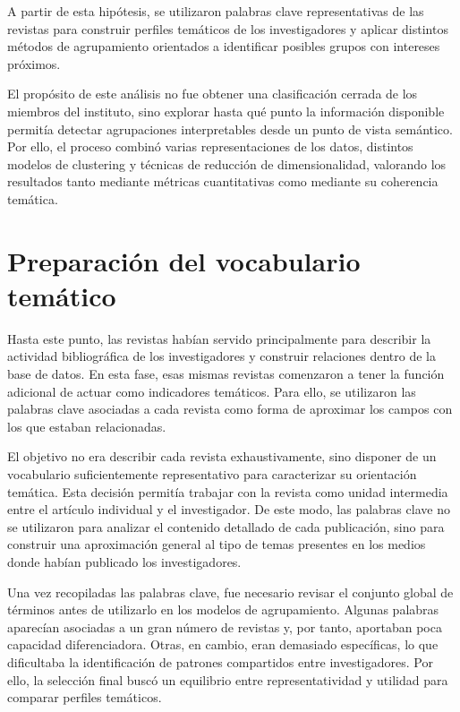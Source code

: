 \documentclass[11pt,spanish,listoffigures,listoftables]{tfgetsinf}
\begin{document}
A partir de esta hipótesis, se utilizaron palabras clave representativas de las revistas para construir perfiles temáticos de los investigadores y aplicar distintos métodos de agrupamiento orientados a identificar posibles grupos con intereses próximos.

El propósito de este análisis no fue obtener una clasificación cerrada de los miembros del instituto, sino explorar hasta qué punto la información disponible permitía detectar agrupaciones interpretables desde un punto de vista semántico. Por ello, el proceso combinó varias representaciones de los datos, distintos modelos de clustering y técnicas de reducción de dimensionalidad, valorando los resultados tanto mediante métricas cuantitativas como mediante su coherencia temática.

\section{Preparación del vocabulario temático}

Hasta este punto, las revistas habían servido principalmente para describir la actividad bibliográfica de los investigadores y construir relaciones dentro de la base de datos. En esta fase, esas mismas revistas comenzaron a tener la función adicional de actuar como indicadores temáticos. Para ello, se utilizaron las palabras clave asociadas a cada revista como forma de aproximar los campos con los que estaban relacionadas.

El objetivo no era describir cada revista exhaustivamente, sino disponer de un vocabulario suficientemente representativo para caracterizar su orientación temática. Esta decisión permitía trabajar con la revista como unidad intermedia entre el artículo individual y el investigador. De este modo, las palabras clave no se utilizaron para analizar el contenido detallado de cada publicación, sino para construir una aproximación general al tipo de temas presentes en los medios donde habían publicado los investigadores.

Una vez recopiladas las palabras clave, fue necesario revisar el conjunto global de términos antes de utilizarlo en los modelos de agrupamiento. Algunas palabras aparecían asociadas a un gran número de revistas y, por tanto, aportaban poca capacidad diferenciadora. Otras, en cambio, eran demasiado específicas, lo que dificultaba la identificación de patrones compartidos entre investigadores. Por ello, la selección final buscó un equilibrio entre representatividad y utilidad para comparar perfiles temáticos.
\end{document}
